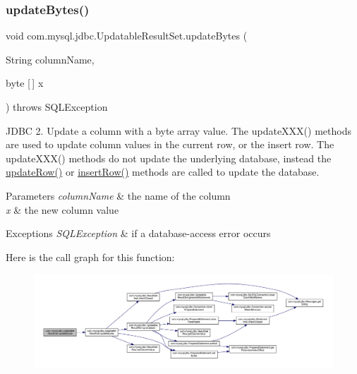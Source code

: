 \subsubsection{\texorpdfstring{update\+Bytes()}{updateBytes()}\hspace{0.1cm}{\footnotesize\ttfamily [2/2]}}
{\footnotesize\ttfamily void com.\+mysql.\+jdbc.\+Updatable\+Result\+Set.\+update\+Bytes (\begin{DoxyParamCaption}\item[{String}]{column\+Name,  }\item[{byte \mbox{[}$\,$\mbox{]}}]{x }\end{DoxyParamCaption}) throws S\+Q\+L\+Exception}

J\+D\+BC 2. Update a column with a byte array value. The update\+X\+X\+X() methods are used to update column values in the current row, or the insert row. The update\+X\+X\+X() methods do not update the underlying database, instead the \mbox{\hyperlink{classcom_1_1mysql_1_1jdbc_1_1_updatable_result_set_a919969ba4b3c7cbc7b18605e9f31a746}{update\+Row()}} or \mbox{\hyperlink{classcom_1_1mysql_1_1jdbc_1_1_updatable_result_set_aef041f8d9d0778083716fc26652648fa}{insert\+Row()}} methods are called to update the database.


\begin{DoxyParams}{Parameters}
{\em column\+Name} & the name of the column \\
\hline
{\em x} & the new column value\\
\hline
\end{DoxyParams}

\begin{DoxyExceptions}{Exceptions}
{\em S\+Q\+L\+Exception} & if a database-\/access error occurs \\
\hline
\end{DoxyExceptions}
Here is the call graph for this function\+:
\nopagebreak
\begin{figure}[H]
\begin{center}
\leavevmode
\includegraphics[width=350pt]{classcom_1_1mysql_1_1jdbc_1_1_updatable_result_set_aad66d9ed9b558743064d1723c3c2b273_cgraph}
\end{center}
\end{figure}
\mbox{\label{classcom_1_1mysql_1_1jdbc_1_1_updatable_result_set_a0ada06905919c11d57c9838b6366a7e3}} 

